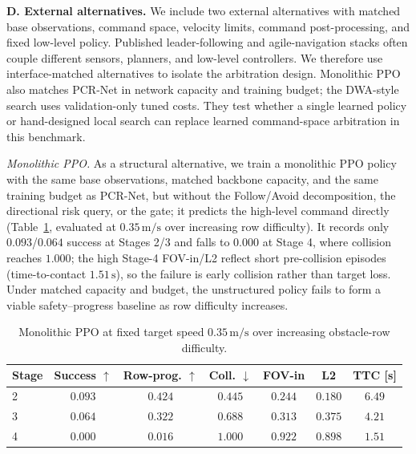 \documentclass[letterpaper, 10 pt, conference]{ieeeconf}
\newcommand{\msec}{\,\mathrm{m/s}}
\begin{document}
\textbf{D. External alternatives.}
\label{sec:external}
We include two external alternatives with matched base observations, command
space, velocity limits, command post-processing, and fixed low-level policy.
Published leader-following and agile-navigation stacks often couple different
sensors, planners, and low-level controllers. We therefore use
interface-matched alternatives to isolate the arbitration design. Monolithic PPO also
matches PCR-Net in network capacity and training budget; the DWA-style search
uses validation-only tuned costs. They test whether a single learned policy or
hand-designed local search can replace learned command-space arbitration in
this benchmark.

\emph{Monolithic PPO.} As a structural alternative, we train a monolithic
PPO policy with the same base observations, matched backbone capacity,
and the same training budget as PCR-Net, but without the Follow/Avoid
decomposition, the directional risk query, or the gate; it predicts the
high-level command directly (Table~\ref{tab:mono}, evaluated at $0.35\msec$
over increasing row difficulty). It records only $0.093$/$0.064$ success at
Stages 2/3 and falls to $0.000$ at Stage 4, where collision reaches $1.000$;
the high Stage-4 FOV-in/L2 reflect short pre-collision episodes
(time-to-contact $1.51\,\mathrm{s}$), so the failure is early collision
rather than target loss. Under matched capacity and budget, the unstructured policy fails to form a
viable safety--progress baseline as row difficulty increases.

\begin{table}[t]
\centering
\caption{Monolithic PPO at fixed target speed $0.35\msec$ over increasing
obstacle-row difficulty.}
\label{tab:mono}
\setlength{\tabcolsep}{4pt}
\footnotesize
\begin{tabular}{lcccccc}
\toprule
Stage & Success $\uparrow$ & Row-prog. $\uparrow$ & Coll. $\downarrow$ &
FOV-in & L2 & TTC [s] \\
\midrule
2 & $0.093$ & $0.424$ & $0.445$ & $0.244$ & $0.180$ & $6.49$ \\
3 & $0.064$ & $0.322$ & $0.688$ & $0.313$ & $0.375$ & $4.21$ \\
4 & $0.000$ & $0.016$ & $1.000$ & $0.922$ & $0.898$ & $1.51$ \\
\bottomrule
\end{tabular}
\end{table}
\end{document}
